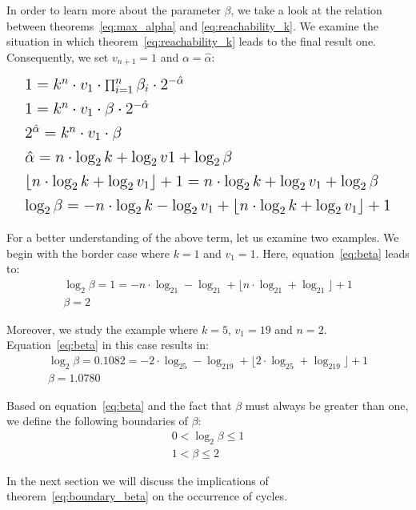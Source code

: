 \documentclass{SciPress_2015}
\renewcommand{\large}{\fontsize{14}{18pt}\selectfont}
\begin{document}
\newpage
\par\noindent
In order to learn more about the parameter $\beta$, we take a look at the relation between theorems~\ref{eq:max_alpha} and \ref{eq:reachability_k}. We examine the situation in which theorem~\ref{eq:reachability_k} leads to the final result one. Consequently, we set $v_{n+1}=1$ and $\alpha=\hat\alpha$:
\begin{equation}
\label{eq:beta}
\large\def\arraystretch{1.2}\begin{array}{l}
	1=k^n\cdot v_1\cdot\prod_{i=1}^{n}\beta_i\cdot2^{-\hat\alpha}\\
	1=k^n\cdot v_1\cdot\beta\cdot2^{-\hat\alpha}\\
	2^{\hat\alpha}=k^n\cdot v_1\cdot\beta\\
	\hat\alpha=n\cdot\log_2k+\log_2v1+\log_2\beta\\
	\lfloor n\cdot\log_2k+\log_2v_1\rfloor+1=n\cdot\log_2k+\log_2v_1+\log_2\beta\\
	\log_2\beta=-n\cdot\log_2k-\log_2v_1+\lfloor n\cdot\log_2k+\log_2v_1\rfloor+1
\end{array}
\end{equation}

For a better understanding of the above term, let us examine two examples. We begin with the border case where $k=1$ and $v_1=1$. Here, equation~\ref{eq:beta} leads to:
\[
\begin{array}{c}
\log_2\beta=1=-n\cdot\log_21-\log_21+\lfloor n\cdot\log_21+\log_21\rfloor+1\\
\beta=2
\end{array}
\]

Moreover, we study the example where $k=5$, $v_1=19$ and $n=2$. Equation~\ref{eq:beta} in this case results in:
\[
\begin{array}{c}
\log_2\beta=0.1082=-2\cdot\log_25-\log_219+\lfloor 2\cdot\log_25+\log_219\rfloor+1\\
\beta=1.0780
\end{array}
\]

Based on equation~\ref{eq:beta} and the fact that $\beta$ must always be greater than one, we define the following boundaries of $\beta$:
\begin{equation}
\label{eq:boundary_beta}
\begin{array}{c}
0<\log_2\beta\le1\\
1<\beta\le2
\end{array}
\end{equation}

In the next section we will discuss the implications of theorem~\ref{eq:boundary_beta} on the occurrence of cycles.
\end{document}
